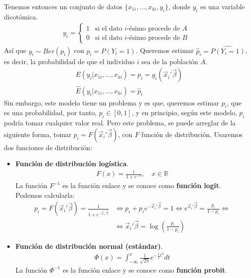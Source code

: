 Tenemos entonces un conjunto de datos $\{x_{1i}, \dots, x_{ki}, y_i\}$, donde $y_i$ es una variable dicotómica.
\begin{align*}
    y_i = \begin{cases}
              1 & \text{si el dato $i$-ésimo procede de $A$} \\
              0 & \text{si el dato $i$-ésimo procede de $B$}
          \end{cases}
\end{align*}
Así que $y_i \sim Ber(p_i)$ con $p_i = P(Y_i = 1)$. Queremos estimar $\widehat{p}_i = \widehat{P(Y_i = 1)}$, es decir, la probabilidad de que el individuo $i$ sea de la población $A$.
\begin{align*}
     & E(y_i | x_{1i}, \dots, x_{ki}) = p_i = g_i(\vec{x}_i'\vec{\beta}) \\
     & \widehat{E}(y_i | x_{1i}, \dots, x_{ki}) = \widehat{p}_i
\end{align*}
Sin embargo, este modelo tiene un problema y es que, queremos estimar $p_i$, que es una probabilidad, por tanto, $p_i \in [0,1]$, y en principio, según este modelo, $p_i$ podría tomar cualquier valor real. Pero este problema, se puede arreglar de la siguiente forma, tomar $p_i = F(\vec{x}_i'\vec{\beta})$, con $F$ función de distribución. Usaremos dos funciones de distribución:
\begin{itemize}
    \item \textbf{Función de distribución logística}.
          \begin{align*}
              F(x) = \frac{1}{1 + e^{-x}}, \quad x \in \mathbb{R}
          \end{align*}
          La función $F^{-1}$ es la función enlace y se conoce como \textbf{función logit}.
          Podemos calcularla:
          \begin{align*}
              p_i = F(\vec{x}_i'\vec{\beta}) = \frac{1}{1 + e^{-\vec{x}_i'\vec{\beta}}} & \Longleftrightarrow p_i + p_ie^{-\vec{x}_i'\vec{\beta}} = 1 \Longleftrightarrow e^{\vec{x}_i'\vec{\beta}} = \frac{p_i}{1 - p_i} \Leftrightarrow \\
                                                                                        & \Longleftrightarrow \vec{x}_i'\vec{\beta} = \log\left(\frac{p_i}{1-p_i}\right)
          \end{align*}
    \item \textbf{Función de distribución normal (estándar)}.
          \begin{align*}
              \Phi(x) = \int_{-\infty}^x \frac{1}{\sqrt{2\pi}} e^{-\frac{1}{2}t^2} dt
          \end{align*}
          La función $\Phi^{-1}$ es la función enlace y se conoce como \textbf{función probit}.
\end{itemize}

